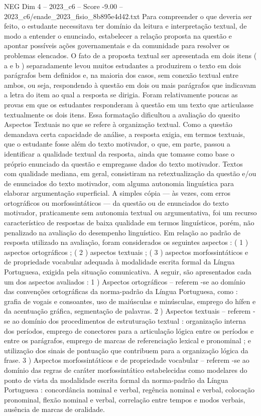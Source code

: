 \begin{textsample}{NEG Dim 4 – 2023\_c6 – Score -9.00 – 2023\_c6/enade\_2023\_fisio\_8b895e4d42.txt}
Para compreender o que deveria ser feito, o estudante necessitava ter domínio da leitura e interpretação textual, de modo a entender o enunciado, estabelecer a relação proposta na questão e apontar possíveis ações governamentais e da comunidade para resolver os problemas elencados.
O fato de a proposta textual ser apresentada em dois itens ( a e b ) separadamente levou muitos estudantes a produzirem o texto em dois parágrafos bem definidos e, na maioria dos casos, sem conexão textual entre ambos, ou seja, respondendo à questão em dois ou mais parágrafos que indicavam a letra do item ao qual a resposta se dirigia.
Foram relativamente poucas as provas em que os estudantes responderam à questão em um texto que articulasse textualmente os dois itens.
Essa formatação dificultou a avaliação do quesito Aspectos Textuais no que se refere à organização textual.
Como a questão demandava certa capacidade de análise, a resposta exigia, em termos textuais, que o estudante fosse além do texto motivador, o que, em parte, passou a identificar a qualidade textual da resposta, ainda que tomasse como base o próprio enunciado da questão e empregasse dados do texto motivador.
Textos com qualidade mediana, em geral, consistiram na retextualização da questão e/ou de enunciados do texto motivador, com alguma autonomia linguística para elaborar argumentação superficial.
A simples cópia — às vezes, com erros ortográficos ou morfossintáticos — da questão ou de enunciados do texto motivador, praticamente sem autonomia textual ou argumentativa, foi um recurso característico de respostas de baixa qualidade em termos linguísticos, porém, não penalizado na avaliação do desempenho linguístico.
Em relação ao padrão de resposta utilizado na avaliação, foram considerados os seguintes aspectos : ( 1 ) aspectos ortográficos ; ( 2 ) aspectos textuais ; ( 3 ) aspectos morfossintáticos e de propriedade vocabular adequada à modalidade escrita formal da Língua Portuguesa, exigida pela situação comunicativa.
A seguir, são apresentados cada um dos aspectos avaliados : 1 ) Aspectos ortográficos – referem -se ao domínio das convenções ortográficas da norma-padrão da Língua Portuguesa, como : grafia de vogais e consoantes, uso de maiúsculas e minúsculas, emprego do hífen e da acentuação gráfica, segmentação de palavras. 2 ) Aspectos textuais – referem -se ao domínio dos procedimentos de estruturação textual : organização interna dos períodos, emprego de conectores para a articulação lógica entre os períodos e entre os parágrafos, emprego de marcas de referenciação lexical e pronominal ; e utilização dos sinais de pontuação que contribuem para a organização lógica da frase. 3 ) Aspectos morfossintáticos e de propriedade vocabular – referem -se ao domínio das regras de caráter morfossintático estabelecidas como modelares do ponto de vista da modalidade escrita formal da norma-padrão da Língua Portuguesa : concordância nominal e verbal, regência nominal e verbal, colocação pronominal, flexão nominal e verbal, correlação entre tempos e modos verbais, ausência de marcas de oralidade.

\end{textsample}
